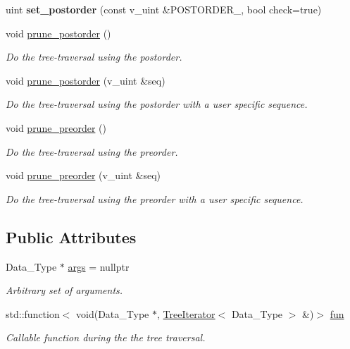 \begin{DoxyCompactItemize}
uint {\bfseries set\+\_\+postorder} (const v\+\_\+uint \&P\+O\+S\+T\+O\+R\+D\+E\+R\+\_\+, bool check=true)
\item 
void \hyperlink{classTree_a7e50f34814e6f158cbff23dbe0312a8e}{prune\+\_\+postorder} ()
\begin{DoxyCompactList}\small\item\em Do the tree-\/traversal using the postorder. \end{DoxyCompactList}\item 
void \hyperlink{classTree_af3b41db2b06a4cac7f2cdb25963e3e3c}{prune\+\_\+postorder} (v\+\_\+uint \&seq)
\begin{DoxyCompactList}\small\item\em Do the tree-\/traversal using the postorder with a user specific sequence. \end{DoxyCompactList}\item 
void \hyperlink{classTree_a960ac327488daa6b2de86ea7be5aee7d}{prune\+\_\+preorder} ()
\begin{DoxyCompactList}\small\item\em Do the tree-\/traversal using the preorder. \end{DoxyCompactList}\item 
void \hyperlink{classTree_afb20a52559dd24b773a694dcbb76ef5c}{prune\+\_\+preorder} (v\+\_\+uint \&seq)
\begin{DoxyCompactList}\small\item\em Do the tree-\/traversal using the preorder with a user specific sequence. \end{DoxyCompactList}\end{DoxyCompactItemize}
\subsection*{Public Attributes}
\begin{DoxyCompactItemize}
\item 
\mbox{\label{classTree_a9f4b61f3b44c2d5e3e4b1dcea5c80a12}} 
Data\+\_\+\+Type $\ast$ \hyperlink{classTree_a9f4b61f3b44c2d5e3e4b1dcea5c80a12}{args} = nullptr
\begin{DoxyCompactList}\small\item\em Arbitrary set of arguments. \end{DoxyCompactList}\item 
std\+::function$<$ void(Data\+\_\+\+Type $\ast$, \hyperlink{classTreeIterator}{Tree\+Iterator}$<$ Data\+\_\+\+Type $>$ \&)$>$ \hyperlink{classTree_a00a788185abbb56febd0b122f62b9ec5}{fun}
\begin{DoxyCompactList}\small\item\em Callable function during the the tree traversal. \end{DoxyCompactList}\end{DoxyCompactItemize}
